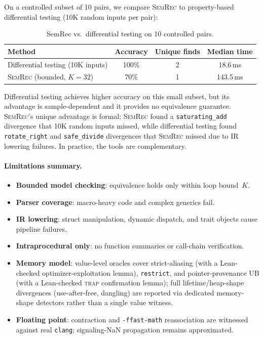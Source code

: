 \documentclass[10pt,a4paper]{article}
\begin{document}
On a controlled subset of 10 pairs, we compare \textsc{SemRec} to
property-based differential testing (10K random inputs per pair):

\begin{table}[t]
\centering
\small
\caption{SemRec vs.\ differential testing on 10 controlled pairs.}
\label{tab:baseline}
\begin{tabular}{@{}lccc@{}}
\toprule
Method & Accuracy & Unique finds & Median time \\
\midrule
Differential testing (10K inputs) & 100\% & 2 & 18.6\,ms \\
\textsc{SemRec} (bounded, $K{=}32$) & 70\% & 1 & 143.5\,ms \\
\bottomrule
\end{tabular}
\end{table}

Differential testing achieves higher accuracy on this small subset,
but its advantage is sample-dependent and it provides no equivalence
guarantee.  \textsc{SemRec}'s unique advantage is formal:
\textsc{SemRec} found a \texttt{saturating\_add} divergence that
10K random inputs missed, while differential testing found
\texttt{rotate\_right} and \texttt{safe\_divide} divergences that
\textsc{SemRec} missed due to IR lowering failures.  In practice,
the tools are complementary.

\paragraph{Limitations summary.}
\begin{itemize}[nosep]
  \item \textbf{Bounded model checking}: equivalence holds only
    within loop bound~$K$.
  \item \textbf{Parser coverage}: macro-heavy code
    and complex generics fail.
  \item \textbf{IR lowering}: struct manipulation, dynamic dispatch,
    and trait objects cause pipeline failures.
  \item \textbf{Intraprocedural only}: no function summaries or
    call-chain verification.
  \item \textbf{Memory model}: value-level oracles cover strict-aliasing
    (with a Lean-checked optimizer-exploitation lemma), \texttt{restrict}, and
    pointer-provenance UB (with a Lean-checked \textsc{trap} confirmation
    lemma); full lifetime/heap-shape divergences (use-after-free,
    dangling) are reported via dedicated memory-shape detectors rather than a
    single value witness.
  \item \textbf{Floating point}: contraction and \texttt{-ffast-math}
    reassociation are witnessed against real \texttt{clang}; signaling-NaN
    propagation remains approximated.
\end{itemize}
\end{document}
